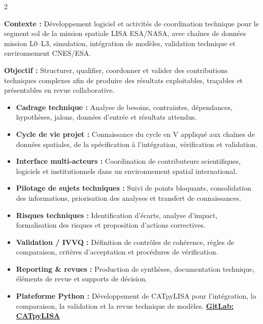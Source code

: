 \documentclass[8pt,a4paper,ragged2e,withhyper]{altacv}
\begin{document}
\begin{paracol}{2}
\divider


\textbf{Contexte :} Développement logiciel et activités de coordination technique pour le segment sol de la mission spatiale LISA ESA/NASA, avec chaînes de données mission L0--L3, simulation, intégration de modèles, validation technique et environnement CNES/ESA.

\textbf{Objectif :} Structurer, qualifier, coordonner et valider des contributions techniques complexes afin de produire des résultats exploitables, traçables et présentables en revue collaborative.

\begin{itemize}
  \item \textbf{Cadrage technique :} Analyse de besoins, contraintes, dépendances, hypothèses, jalons, données d’entrée et résultats attendus.
  \item \textbf{Cycle de vie projet :} Connaissance du cycle en V appliqué aux chaînes de données spatiales, de la spécification à l’intégration, vérification et validation.
  \item \textbf{Interface multi-acteurs :} Coordination de contributeurs scientifiques, logiciels et institutionnels dans un environnement spatial international.
  \item \textbf{Pilotage de sujets techniques :} Suivi de points bloquants, consolidation des informations, priorisation des analyses et transfert de connaissances.
  \item \textbf{Risques techniques :} Identification d’écarts, analyse d’impact, formalisation des risques et proposition d’actions correctives.
  \item \textbf{Validation / IVVQ :} Définition de contrôles de cohérence, règles de comparaison, critères d’acceptation et procédures de vérification.
  \item \textbf{Reporting \& revues :} Production de synthèses, documentation technique, éléments de revue et supports de décision.
  \item \textbf{Plateforme Python :} Développement de CATpyLISA pour l’intégration, la comparaison, la validation et la revue technique de modèles.
  \textcolor{DarkPastelRed}{\href{https://gitlab.oca.eu/gboileau/lisa_l3_tools}{\bf GitLab: CATpyLISA}}
\end{itemize}

\divider


\end{paracol}
\end{document}
